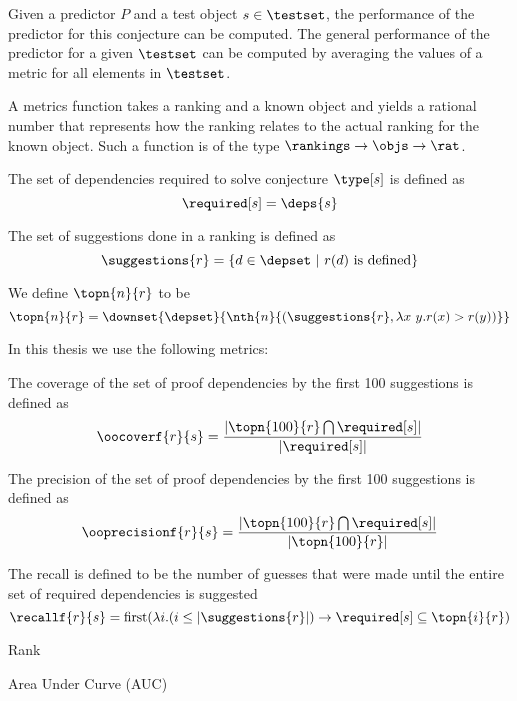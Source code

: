 Given a predictor $P$ and a test object $s \in \testset$,
the performance of the predictor for this conjecture can be computed.
The general performance of the predictor for a given $\testset$
can be computed by averaging the values of a metric for all elements in $\testset$.

\begin{definition}
  A metrics function takes a ranking and a known object and yields a rational number
  that represents how the ranking relates to the actual ranking for the known object.
  Such a function is of the type $\rankings \rightarrow \objs \rightarrow \rat$.
\end{definition}

\begin{definition} The set of dependencies required to solve conjecture $\type[s]$ is defined as
  \[ \required[s] = \deps{s} \]
\end{definition}

\begin{definition} The set of suggestions done in a ranking is defined as
  \[ \suggestions{r} = \{ d \in \depset ~|~ r(d) ~\text{is defined} \} \]
\end{definition}

\begin{definition} We define $\topn{n}{r}$ to be
  \[ \topn{n}{r} = \downset{\depset}{\nth{n}{(\suggestions{r}, \lambda x~y. r(x) > r(y))}} \]
\end{definition}

In this thesis we use the following metrics:
\begin{definition}
  The coverage of the set of proof dependencies by the first 100 suggestions is defined as
  \[ \oocoverf{r}{s} = \frac{ |\topn{100}{r} \bigcap \required[s]| } { |\required[s]| } \]
\end{definition}

\begin{definition}
  The precision of the set of proof dependencies by the first 100 suggestions is defined as
  \[ \ooprecisionf{r}{s} = \frac{ |\topn{100}{r} \bigcap \required[s]| } { |\topn{100}{r}| } \]
\end{definition}

\begin{definition}
  The recall is defined to be the number of guesses that were made until the entire set of required dependencies is suggested
  \[ \recallf{r}{s} =  \text{first}(\lambda i. (i \leq |\suggestions{r}|) \rightarrow \required[s] \subseteq \topn{i}{r}) \]
\end{definition}

\begin{definition}{Rank}
\end{definition}

\begin{definition}{Area Under Curve (AUC)}
\end{definition}
